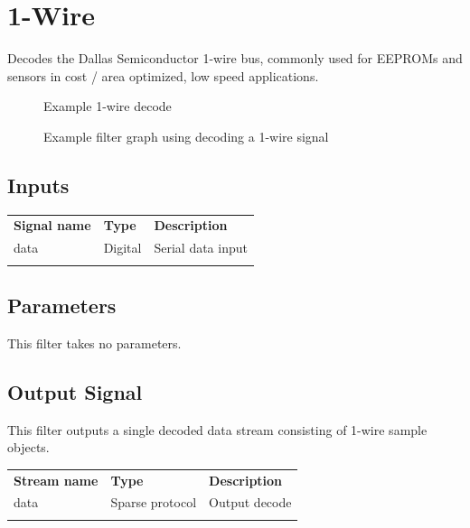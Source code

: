 \section{1-Wire}
\label{filter:1wire}

Decodes the Dallas Semiconductor 1-wire bus, commonly used for EEPROMs and sensors in cost / area optimized, low speed
applications.

\begin{figure}[h]
\centering
{}
\caption{Example 1-wire decode}
\label{filter_1wire}
\end{figure}

\begin{figure}[h]
\centering
{}
\caption{Example filter graph using decoding a 1-wire signal}
\label{filter_graph_1wire}
\end{figure}

\subsection{Inputs}

\begin{tabularx}{16cm}{llX}
\thickhline
\textbf{Signal name} & \textbf{Type} & \textbf{Description} \\
\thickhline
data & Digital & Serial data input \\
\thickhline
\end{tabularx}

\subsection{Parameters}

This filter takes no parameters.

\subsection{Output Signal}

This filter outputs a single decoded data stream consisting of 1-wire sample objects.

\begin{tabularx}{16cm}{llX}
\thickhline
\textbf{Stream name} & \textbf{Type} & \textbf{Description} \\
\thickhline
data & Sparse protocol & Output decode \\
\thickhline
\end{tabularx}

